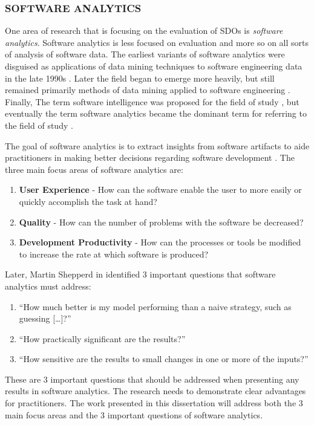 \documentclass[SDSUThesis.tex]{subfiles}
\begin{document}
\subsubsection{SOFTWARE ANALYTICS}
\label{subsub:softwareanalytics}

    One area of research that is focusing on the evaluation 
    of SDOs
    is \textit{software analytics}. 
    Software analytics is less focused on evaluation
    and more so on all sorts of analysis of software data.
    The earliest variants
    of software analytics were disguised as
    applications of data mining techniques to software 
    engineering data in the 
    late 1990s \cite{Ruhe1997,Ebert1999,Goel1997}.   
    Later the field began to emerge more heavily, but still
    remained primarily methods of data mining applied to 
    software engineering \cite{Kaner2004,Xie2009,Taylor2010,Halkidi2011}. 
    Finally, The term software intelligence was proposed for the field of study
    \cite{Hassan2010}, but eventually
    the term software analytics became the dominant term for referring to the 
    field of study \cite{Buse2010, Zhang2011}.
    
    The goal of software analytics is to extract insights
    from software artifacts to aide practitioners in making 
    better decisions regarding software
    development \cite{Zhang2013}.  The three main focus areas of 
    software analytics are:
    \begin{enumerate}
        \item \textbf{User Experience} - How can the software enable the 
            user to more easily or quickly 
            accomplish the task at hand?
        \item \textbf{Quality} - How can the number of problems with 
            the software be decreased?
        \item \textbf{Development Productivity} - How can the processes
            or tools be modified to increase 
            the rate at which software is produced? 
    \end{enumerate}

    Later, Martin Shepperd in \cite{Hassan2013} identified 3 important questions that software
    analytics must address:
    \begin{enumerate}
        \item ``How much better is my model performing than 
            a naive strategy, such as guessing [\ldots]?''
        \item ``How practically significant are the results?''
        \item ``How sensitive are the results to small changes in 
            one or more of the inputs?''
    \end{enumerate}
    These are 3 important questions that should be addressed 
    when presenting any results in software analytics.  The research
    needs to demonstrate clear advantages for practitioners.  The work
    presented in this dissertation will address both the 3 main focus areas and
    the 3 important questions of software analytics.
\end{document}
